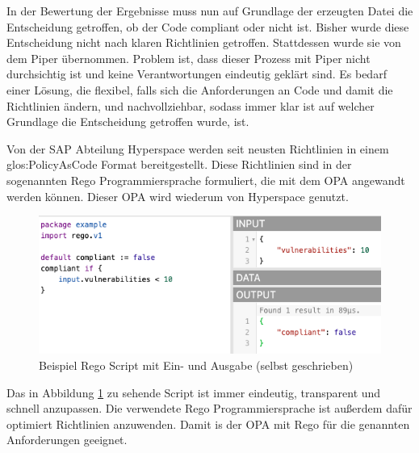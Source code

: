\documentclass[../main.tex]{subfiles}
\begin{document}
In der Bewertung der Ergebnisse muss nun auf Grundlage der erzeugten Datei die Entscheidung getroffen, ob der Code compliant oder nicht ist.
Bisher wurde diese Entscheidung nicht nach klaren Richtlinien getroffen.
Stattdessen wurde sie von dem Piper übernommen.
Problem ist, dass dieser Prozess mit Piper nicht durchsichtig ist und keine Verantwortungen eindeutig geklärt sind.
Es bedarf einer Lösung, die flexibel, falls sich die Anforderungen an Code und damit die Richtlinien ändern, und nachvollziehbar, sodass immer klar ist auf welcher Grundlage die Entscheidung getroffen wurde, ist.

Von der SAP Abteilung Hyperspace werden seit neusten Richtlinien in einem \gls{glos:PolicyAsCode} Format bereitgestellt.
Diese Richtlinien sind in der sogenannten Rego Programmiersprache formuliert, die mit dem \gls{OPA} angewandt werden können.
Dieser \gls{OPA} wird wiederum von Hyperspace genutzt.

\begin{figure}[ht]
    \centering
    \includegraphics[scale=0.65]{bilder/regoexample.png}
    \caption{Beispiel Rego Script mit Ein- und Ausgabe (selbst geschrieben)}
    \label{fig:regoexample}
\end{figure}

Das in Abbildung \ref{fig:regoexample} zu sehende Script ist immer eindeutig, transparent und schnell anzupassen.
Die verwendete Rego Programmiersprache ist außerdem dafür optimiert Richtlinien anzuwenden.
Damit is der \gls{OPA} mit Rego für die genannten Anforderungen geeignet.
\cite{Rego}
\end{document}
